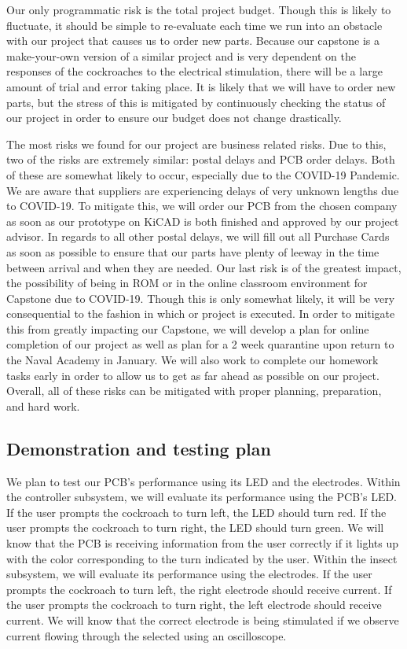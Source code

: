 \documentclass[twocolumn,10pt]{IEEEtran}
\begin{document}
Our only programmatic risk is the total project budget. Though this is likely to fluctuate, it should be simple to re-evaluate each time we run into an obstacle with our project that causes us to order new parts. Because our capstone is a make-your-own version of a similar project and is very dependent on the responses of the cockroaches to the electrical stimulation, there will be a large amount of trial and error taking place. It is likely that we will have to order new parts, but the stress of this is mitigated by continuously checking the status of our project in order to ensure our budget does not change drastically.

The most risks we found for our project are business related risks. Due to this, two of the risks are extremely similar: postal delays and PCB order delays. Both of these are somewhat likely to occur, especially due to the COVID-19 Pandemic. We are aware that suppliers are experiencing delays of very unknown lengths due to COVID-19. To mitigate this, we will order our PCB from the chosen company as soon as our prototype on KiCAD is both finished and approved by our project advisor. In regards to all other postal delays, we will fill out all Purchase Cards as soon as possible to ensure that our parts have plenty of leeway in the time between arrival and when they are needed. Our last risk is of the greatest impact, the possibility of being in ROM or in the online classroom environment for Capstone due to COVID-19. Though this is only somewhat likely, it will be very consequential to the fashion in which or project is executed. In order to mitigate this from greatly impacting our Capstone, we will develop a plan for online completion of our project as well as plan for a 2 week quarantine upon return to the Naval Academy in January. We will also work to complete our homework tasks early in order to allow us to get as far ahead as possible on our project. Overall, all of these risks can be mitigated with proper planning, preparation, and hard work.

\subsection{Demonstration and testing plan}
We plan to test our PCB's performance using its LED and the electrodes. Within the controller subsystem, we will evaluate its performance using the PCB's LED. If the user prompts the cockroach to turn left, the LED should turn red. If the user prompts the cockroach to turn right, the LED should turn green. We will know that the PCB is receiving information from the user correctly if it lights up with the color corresponding to the turn indicated by the user. Within the insect subsystem, we will evaluate its performance using the electrodes. If the user prompts the cockroach to turn left, the right electrode should receive current. If the user prompts the cockroach to turn right, the left electrode should receive current. We will know that the correct electrode is being stimulated if we observe current flowing through the selected using an oscilloscope.
\end{document}
